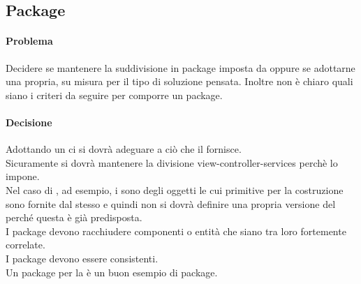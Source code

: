 \subsection{Package}
\paragraph{Problema}
Decidere se mantenere la suddivisione in package imposta da  oppure se adottarne una propria, su misura per il tipo di soluzione pensata. Inoltre non è chiaro quali siano i criteri da seguire per comporre un package.
\paragraph{Decisione}
Adottando un  ci si dovrà adeguare a ciò che il  fornisce. \\
Sicuramente si dovrà mantenere la divisione view-controller-services perchè  lo impone. \\
Nel caso di , ad esempio, i  sono degli oggetti le cui primitive per la costruzione sono fornite dal  stesso e quindi non si dovrà definire una propria versione del  perché questa è già predisposta. \\
I package devono racchiudere componenti o entità che siano tra loro fortemente correlate. \\
I package devono essere consistenti.  \\
Un package per la  è un buon esempio di package.
